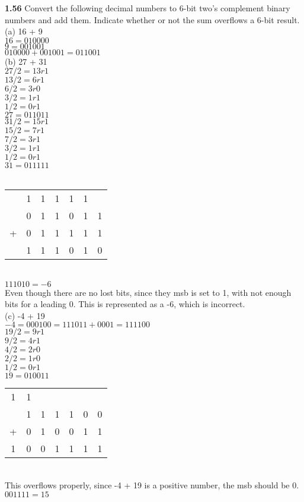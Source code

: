 \documentclass[12pt,a4paper]{report}
\begin{document}
\begin{normalsize}
\textbf{1.56} Convert the following decimal numbers to 6-bit two's complement binary numbers and add them. Indicate whether or not the sum overflows a 6-bit result. \\
(a) 16 + 9 \\
$ 16 = 010000 $ \\
$ 9 = 001001 $ \\
$ 010000 + 001001 = 011001 $ \\

(b) 27 + 31 \\
$ 27/2 = 13r1 $ \\
$ 13/2 = 6r1 $ \\
$ 6/2 = 3r0 $ \\
$ 3/2 = 1r1 $ \\
$ 1/2 = 0r1 $ \\
$ 27 = 011011 $ \\
$ 31/2 = 15r1 $ \\
$ 15/2 = 7r1 $ \\
$ 7/2 = 3r1 $ \\
$ 3/2 = 1r1 $ \\
$ 1/2 = 0r1 $ \\
$ 31 = 011111 $ \\ \\
\begin{tabular}{c@{\,}c@{\,}c@{\,}c@{\,}c@{\,}c@{\,}c}
  & 1 & 1 & 1 & 1 & 1 & \\
  & 0 & 1 & 1 & 0 & 1 & 1 \\
+ & 0 & 1 & 1 & 1 & 1 & 1 \\
\hline
  & 1 & 1 & 1 & 0 & 1 & 0 \\
\end{tabular} \\
$ 111010 = -6 $ \\
Even though there are no lost bits, since they msb is set to 1, with not enough bits for a leading 0. This is represented as a -6, which is incorrect. \\

(c) -4 + 19 \\
$ -4 = 000100 = 111011 + 0001 = 111100 $ \\
$ 19/2 = 9r1 $ \\
$ 9/2 = 4r1 $ \\
$ 4/2 = 2r0 $ \\
$ 2/2 = 1r0 $ \\
$ 1/2 = 0r1$ \\
$ 19 = 010011 $ \\ 
\begin{tabular}{c@{\,}c@{\,}c@{\,}c@{\,}c@{\,}c@{\,}c}
1 & 1 &   &   &   &   & \\
  & 1 & 1 & 1 & 1 & 0 & 0 \\
+ & 0 & 1 & 0 & 0 & 1 & 1 \\
\hline
1 & 0 & 0 & 1 & 1 & 1 & 1 \\
\end{tabular} \\
This overflows properly, since -4 + 19 is a positive number, the msb should be 0. \\
$ 001111 = 15 $ \\


\end{normalsize}
\end{document}
